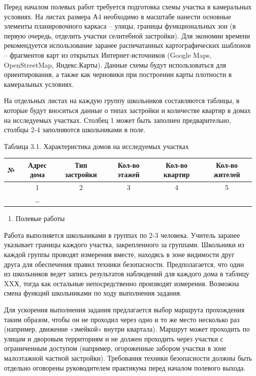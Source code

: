 \documentclass[
  11pt,
  russian,
]{book}
\providecommand{\tightlist}{%
  \setlength{\itemsep}{0pt}\setlength{\parskip}{0pt}}
\begin{document}
Перед началом полевых работ требуется подготовка схемы участка в камеральных условиях. На листах размера А4 необходимо в масштабе нанести основные элементы планировочного каркаса -- улицы, границы функциональных зон (в первую очередь, отделить участки селитебной застройки). Для экономии времени рекомендуется использование заранее распечатанных картографических шаблонов -- фрагментов карт из открытых Интернет-источников (Google Maps, OpenStreetMap, Яндекс.Карты). Данные схемы будут использоваться для ориентирования, а также как черновики при построении карты плотности в камеральных условиях.

На отдельных листах на каждую группу школьников составляются таблицы, в которые будут вноситься данные о типах застройки и количестве квартир в домах на исследуемых участках. Столбец 1 может быть заполнен предварительно, столбцы 2-4 заполняются школьниками в поле.

Таблица 3.1. Характеристика домов на исследуемых участках

\begin{longtable}[]{@{}lccccc@{}}
\toprule
№ & Адрес дома & Тип застройки & Кол-во этажей & Кол-во квартир & Кол-во жителей \\
\midrule
\endhead
& 1 & 2 & 3 & 4 & 5 \\
& \ldots{} & & & & \\
\bottomrule
\end{longtable}

\begin{enumerate}
\def\labelenumi{\arabic{enumi}.}
\setcounter{enumi}{1}
\tightlist
\item
  Полевые работы
\end{enumerate}

Работа выполняется школьниками в группах по 2-3 человека. Учитель заранее указывает границы каждого участка, закрепленного за группами. Школьники из каждой группы проводят измерения вместе, находясь в зоне видимости друг друга для обеспечения правил техники безопасности. Предполагается, что один из школьников ведет запись результатов наблюдений для каждого дома в таблицу XXХ, тогда как остальные непосредственно производят измерения. Возможна смена функций школьниками по ходу выполнения задания.

Для ускорения выполнения задания предлагается выбор маршрута прохождения таким образом, чтобы он не проходил через одно и то же место несколько раз (например, движение «змейкой» внутри квартала). Маршрут может проходить по улицам и дворовым территориям и не должен проходить через участки с ограниченным доступом (например, огороженные забором участки в зоне малоэтажной частной застройки). Требования техники безопасности должны быть отдельно оговорены руководителем практикума перед началом полевого выхода.
\end{document}
